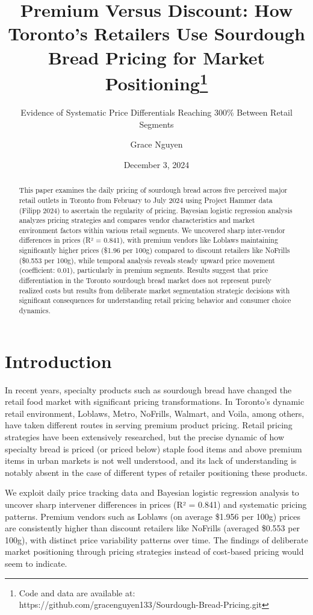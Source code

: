 \documentclass[
  letterpaper,
  DIV=11,
  numbers=noendperiod]{scrartcl}
\title{Premium Versus Discount: How Toronto's Retailers Use Sourdough
Bread Pricing for Market Positioning\thanks{Code and data are available
at: https://github.com/gracenguyen133/Sourdough-Bread-Pricing.git}}
\subtitle{Evidence of Systematic Price Differentials Reaching 300\%
Between Retail Segments}
\author{Grace Nguyen}
\date{December 3, 2024}
\begin{document}
\maketitle
\begin{abstract}
This paper examines the daily pricing of sourdough bread across five
perceived major retail outlets in Toronto from February to July 2024
using Project Hammer data (Filipp 2024) to ascertain the regularity of
pricing. Bayesian logistic regression analysis analyzes pricing
strategies and compares vendor characteristics and market environment
factors within various retail segments. We uncovered sharp inter-vendor
differences in prices (R² = 0.841), with premium vendors like Loblaws
maintaining significantly higher prices (\$1.96 per 100g) compared to
discount retailers like NoFrills (\$0.553 per 100g), while temporal
analysis reveals steady upward price movement (coefficient: 0.01),
particularly in premium segments. Results suggest that price
differentiation in the Toronto sourdough bread market does not represent
purely realized costs but results from deliberate market segmentation
strategic decisions with significant consequences for understanding
retail pricing behavior and consumer choice dynamics.
\end{abstract}


\tableofcontents

\newpage

\section{Introduction}\label{introduction}

In recent years, specialty products such as sourdough bread have changed
the retail food market with significant pricing transformations. In
Toronto's dynamic retail environment, Loblaws, Metro, NoFrills, Walmart,
and Voila, among others, have taken different routes in serving premium
product pricing. Retail pricing strategies have been extensively
researched, but the precise dynamic of how specialty bread is priced (or
priced below) staple food items and above premium items in urban markets
is not well understood, and its lack of understanding is notably absent
in the case of different types of retailer positioning these products.

We exploit daily price tracking data and Bayesian logistic regression
analysis to uncover sharp intervener differences in prices (R² = 0.841)
and systematic pricing patterns. Premium vendors such as Loblaws (on
average \$1.956 per 100g) prices are consistently higher than discount
retailers like NoFrills (averaged \$0.553 per 100g), with distinct price
variability patterns over time. The findings of deliberate market
positioning through pricing strategies instead of cost-based pricing
would seem to indicate.
\end{document}
